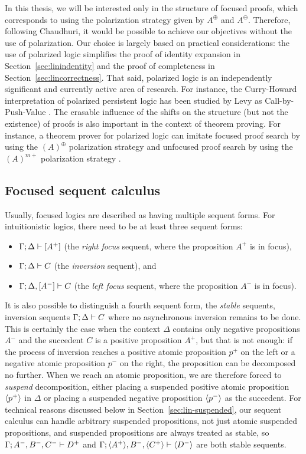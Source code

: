 In this thesis, we will be interested only in the structure of focused
proofs, which corresponds to using the polarization strategy given by
$A^\oplus$ and $A^\ominus$. Therefore, following Chaudhuri, it would
be possible to achieve our objectives without the use of polarization.
Our choice is largely based on practical
considerations: the use of polarized logic simplifies the proof of
identity expansion in Section~\ref{sec:linindentity} and the proof of
completeness in Section~\ref{sec:lincorrectness}. That said, polarized
logic is an independently significant and currently active area of
research. For instance, the Curry-Howard
interpretation of polarized persistent logic has been studied by Levy
as Call-by-Push-Value \cite{levy04call}. The erasable influence of the
shifts on the structure (but not the existence) of proofs is also
important in the context of theorem proving. For instance, a theorem
prover for polarized logic can imitate focused proof search by using
the $(A)^\oplus$ polarization strategy and unfocused proof search by
using the $(A)^{m+}$ polarization strategy
\cite{mclaughlin09efficient}.

\subsection{Focused sequent calculus}
\label{sec:linfocseqcalcdef}

Usually, focused logics are described as having multiple sequent
forms. For intuitionistic logics, there need to be at least three
sequent forms:
\smallskip
\begin{itemize}
\item ${\Gamma};{\Delta} \vdash [{A^+}] \mathstrut$ (the {\it right focus} sequent, where
the proposition $A^+$ is in focus),
\item ${\Gamma};{\Delta} \vdash {C} \mathstrut$ (the {\it inversion} sequent), and
\item ${\Gamma};{\Delta}, [{A^-}] \vdash {C} \mathstrut$ (the {\it left focus} sequent,
where the proposition $A^-$ is in focus).
\end{itemize}
\smallskip
It is also possible to distinguish a fourth sequent form, the {\it
  stable} sequents, inversion sequents ${\Gamma};{\Delta} \vdash {C} \mathstrut$
where no asynchronous inversion remains to be done. This is certainly
the case when the context $\Delta$ contains only negative propositions
$A^-$ and the succedent $C$ is a positive proposition $A^+$, but that
is not enough: if the process of inversion reaches a positive atomic
proposition $p^+$ on the left or a negative atomic proposition $p^-$
on the right, the proposition can be decomposed no further. When we
reach an atomic proposition, we are therefore forced to {\it suspend}
decomposition, either placing a suspended positive atomic proposition
$\langle {p^+} \rangle$ in $\Delta$ or placing a suspended negative proposition
$\langle {p^-} \rangle$ as the succedent. For technical reasons discussed below
in Section~\ref{sec:lin-suspended}, our sequent calculus can handle
arbitrary suspended propositions, not just atomic suspended
propositions, and suspended propositions are always treated as stable,
so ${\Gamma};{A^-, B^-, C^-} \vdash {D^+} \mathstrut$ and
${\Gamma};{\langle {A^+} \rangle, B^-, \langle {C^+} \rangle} \vdash {\langle {D^-} \rangle} \mathstrut$ are both
stable sequents.

